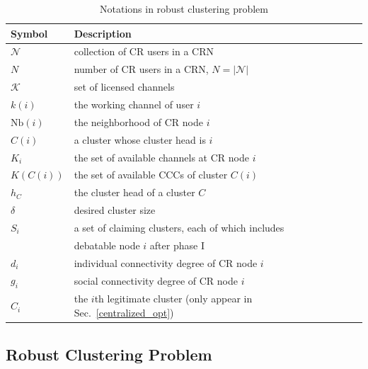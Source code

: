\documentclass[10pt,journal,compsoc]{IEEEtran}
\theoremstyle{mytheoremstyle}
\theoremstyle{mytheoremstyle}
\theoremstyle{mytheoremstyle}
\begin{document}


\begin{table}[h!]
\caption{Notations in robust clustering problem}
\label{tab1}
\centering
\begin{tabular}{llr}
\toprule
Symbol & Description \\
\midrule
$\mathcal{N}$  & collection of CR users in a CRN\\
$N$ & number of CR users in a CRN, $N=|\mathcal{N}|$\\
$\mathcal{K}$	& set of licensed channels\\
$k(i)$ & the working channel of user $i$\\
$\text{Nb}(i)$ & the neighborhood of CR node $i$    \\
$C(i)$ & a cluster whose cluster head is $i$  \\
$K_i$   & the set of available channels at CR node $i$  \\
$K(C(i))$   & the set of available CCCs of cluster $C(i)$ \\
$h_C$ & the cluster head of a cluster $C$\\
$\delta$ & desired cluster size\\
$S_i$ & a set of claiming clusters, each of which includes \\
& debatable node $i$ after phase I\\
$d_i$  & individual connectivity degree of CR node $i$\\
$g_i$  & social connectivity degree of CR node $i$\\
$C_i$  & the $i$th legitimate cluster (only appear in Sec.~\ref{centralized_opt})\\
\bottomrule
\end{tabular}
\end{table}


\subsection{Robust Clustering Problem}
\label{centralized_scheme}
\end{document}
